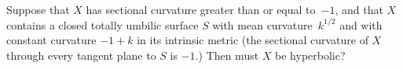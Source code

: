 \begin{question}
Suppose that $X$ has sectional curvature greater than or equal to~$-1$, and that $X$ contains a closed totally umbilic surface $S$ with mean curvature~$k^{1/2}$ and with constant curvature $-1 +k$ in its intrinsic metric (\ie the sectional curvature of $X$ through every tangent plane to $S$ is $-1$.) Then must $X$ be hyperbolic?
\end{question}
